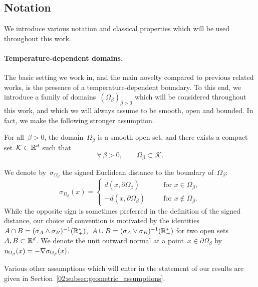     \subsection{Notation}
    \label{02:subsec:notation}
    We introduce various notation and classical properties which will be used throughout this work.
    \paragraph{Temperature-dependent domains.}
    The basic setting we work in, and the main novelty compared to previous related works, is the presence of a temperature-dependent boundary. To this end, we introduce a family of domains~$\left(\Omega_\beta\right)_{\beta>0}$ which will be considered throughout this work, and which we will always assume to be smooth, open and bounded.
    In fact, we make the following stronger assumption.
    \begin{hypothesis}
        For all~$\beta>0$, the domain~$\Omega_\beta$ is a smooth open set, and there exists a compact set~$\mathcal K \subset \mathbb{R}^d$ such that
        \begin{equation}
            \label{02:hyp:uniformly_bounded}
            \tag{\bf H0}
            \forall\,\beta>0,\qquad\Omega_\beta \subset \mathcal K.
        \end{equation}
    \end{hypothesis}
    We denote by~$\sigma_{\Omega_\beta}$ the signed Euclidean distance to the boundary of~$\Omega_\beta$:
    \begin{equation}
        \label{02:eq:sdf}
        \sigma_{\Omega_\beta}(x) = \left\{\begin{aligned}
            d(x,\partial\Omega_\beta)&&\quad\textrm{for }x\in\Omega_\beta,\\
            -d(x,\partial\Omega_\beta)&&\quad\textrm{for }x\not\in\Omega_\beta.
        \end{aligned}\right.
    \end{equation}
    While the opposite sign is sometimes preferred in the definition of the signed distance, our choice of convention is motivated by the identities ~$A\cap B = (\sigma_A \land \sigma_B)^{-1}(\mathbb{R}_+^*)$,~$A\cup B = (\sigma_A \lor \sigma_B)^{-1}(\mathbb{R}_+^*)$ for two open sets~$A,B\subset \mathbb{R}^d$.
    We denote the unit outward normal at a point~$x\in\partial \Omega_\beta$ by~$\mathrm{n}_{\Omega_\beta}(x) = -\nabla \sigma_{\Omega_\beta}(x)$.

    Various other assumptions which will enter in the statement of our results are given in Section~\ref{02:subsec:geometric_assumptions}.
